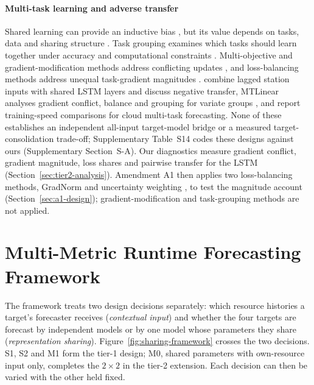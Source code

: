 \documentclass[5p,twocolumn]{elsarticle}
\begin{document}
\paragraph{Multi-task learning and adverse transfer} Shared learning can
provide an inductive bias \citep{Caruana1997Multitask}, but its value depends
on tasks, data and sharing structure \citep{Yu2025MultitaskFundamentals}.
Task grouping examines which tasks should learn together under accuracy and
computational constraints \citep{Standley2020TaskGrouping,Fifty2021TaskGroupings}.
Multi-objective and gradient-modification methods address conflicting updates
\citep{Sener2018MultiObjective,Yu2020GradientSurgery}, and loss-balancing
methods address unequal task-gradient magnitudes \citep{Chen2018GradNorm}.
\citet{Nikentari2022NARMAXLSTM} combine lagged station inputs with shared LSTM
layers and discuss negative transfer, MTLinear analyses gradient conflict,
balance and grouping for variate groups \citep{Nochumsohn2025MTLinear}, and
\citet{Bi2019CloudMultitask} report training-speed comparisons for cloud
multi-task forecasting. None of these establishes an independent all-input
target-model bridge or a measured target-consolidation trade-off;
Supplementary Table~S14 codes these designs against ours (Supplementary
Section~S-A). Our diagnostics measure gradient conflict, gradient magnitude,
loss shares and pairwise transfer for the LSTM
(Section~\ref{sec:tier2-analysis}). Amendment A1 then applies two
loss-balancing methods, GradNorm \citep{Chen2018GradNorm} and uncertainty
weighting \citep{Kendall2018Uncertainty}, to test the magnitude account
(Section~\ref{sec:a1-design}); gradient-modification and task-grouping
methods are not applied.

\section{Multi-Metric Runtime Forecasting Framework}
\label{sec:framework}

The framework treats two design decisions separately: which resource
histories a target's forecaster receives (\emph{contextual input}) and
whether the four targets are forecast by independent models or by one model
whose parameters they share (\emph{representation sharing}).
Figure~\ref{fig:sharing-framework} crosses the two decisions. S1, S2 and M1
form the tier-1 design; M0, shared parameters with own-resource
input only, completes the $2\times2$ in the tier-2 extension. Each decision
can then be varied with the other held fixed.
\end{document}
